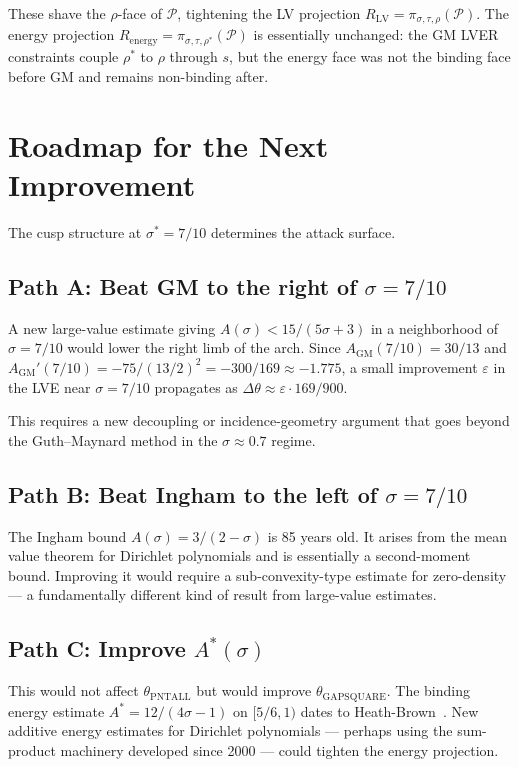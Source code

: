 \documentclass[11pt,a4paper]{article}
\begin{document}
These shave the $\rho$-face of $\mathcal{P}$, tightening the LV projection $R_{\mathrm{LV}} = \pi_{\sigma,\tau,\rho}(\mathcal{P})$.  The energy projection $R_{\mathrm{energy}} = \pi_{\sigma,\tau,\rho^{*}}(\mathcal{P})$ is essentially unchanged: the GM LVER constraints couple $\rho^{*}$ to $\rho$ through $s$, but the energy face was not the binding face before GM and remains non-binding after.

\section{Roadmap for the Next Improvement}

The cusp structure at $\sigma^{*} = 7/10$ determines the attack surface.

\subsection*{Path A: Beat GM to the right of $\sigma = 7/10$}

A new large-value estimate giving $A(\sigma) < 15/(5\sigma + 3)$ in a neighborhood of $\sigma = 7/10$ would lower the right limb of the arch.  Since $A_{\mathrm{GM}}(7/10) = 30/13$ and $A_{\mathrm{GM}}'(7/10) = -75/(13/2)^{2} = -300/169 \approx -1.775$, a small improvement $\varepsilon$ in the LVE near $\sigma = 7/10$ propagates as $\Delta\theta \approx \varepsilon \cdot 169/900$.

This requires a new decoupling or incidence-geometry argument that goes beyond the Guth--Maynard method in the $\sigma \approx 0.7$ regime.

\subsection*{Path B: Beat Ingham to the left of $\sigma = 7/10$}

The Ingham bound $A(\sigma) = 3/(2 - \sigma)$ is 85 years old.  It arises from the mean value theorem for Dirichlet polynomials and is essentially a second-moment bound.  Improving it would require a sub-convexity-type estimate for zero-density --- a fundamentally different kind of result from large-value estimates.

\subsection*{Path C: Improve $A^{*}(\sigma)$}

This would not affect $\theta_{\mathrm{PNTALL}}$ but would improve $\theta_{\mathrm{GAPSQUARE}}$.  The binding energy estimate $A^{*} = 12/(4\sigma - 1)$ on $[5/6, 1)$ dates to Heath-Brown~\cite{HB79zd}.  New additive energy estimates for Dirichlet polynomials --- perhaps using the sum-product machinery developed since 2000 --- could tighten the energy projection.
\end{document}
